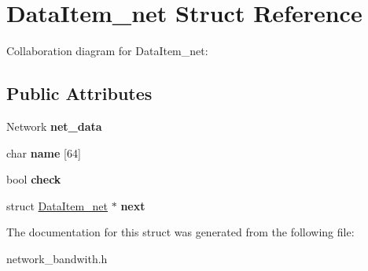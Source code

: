 \hypertarget{structDataItem__net}{}\section{Data\+Item\+\_\+net Struct Reference}
\label{structDataItem__net}


Collaboration diagram for Data\+Item\+\_\+net\+:
\subsection*{Public Attributes}
\begin{DoxyCompactItemize}
\item 
Network {\bfseries net\+\_\+data}\hypertarget{structDataItem__net_a15ec07da3742b200dd0d5a8f95d341be}{}\label{structDataItem__net_a15ec07da3742b200dd0d5a8f95d341be}

\item 
char {\bfseries name} \mbox{[}64\mbox{]}\hypertarget{structDataItem__net_ac9f199b32a994d9954afcd306f755fe7}{}\label{structDataItem__net_ac9f199b32a994d9954afcd306f755fe7}

\item 
bool {\bfseries check}\hypertarget{structDataItem__net_ad97c159e217cc5673e836eea867043f6}{}\label{structDataItem__net_ad97c159e217cc5673e836eea867043f6}

\item 
struct \hyperlink{structDataItem__net}{Data\+Item\+\_\+net} $\ast$ {\bfseries next}\hypertarget{structDataItem__net_a4369499ed176029ba4a16a713e6f53a8}{}\label{structDataItem__net_a4369499ed176029ba4a16a713e6f53a8}

\end{DoxyCompactItemize}


The documentation for this struct was generated from the following file\+:\begin{DoxyCompactItemize}
\item 
network\+\_\+bandwith.\+h\end{DoxyCompactItemize}
